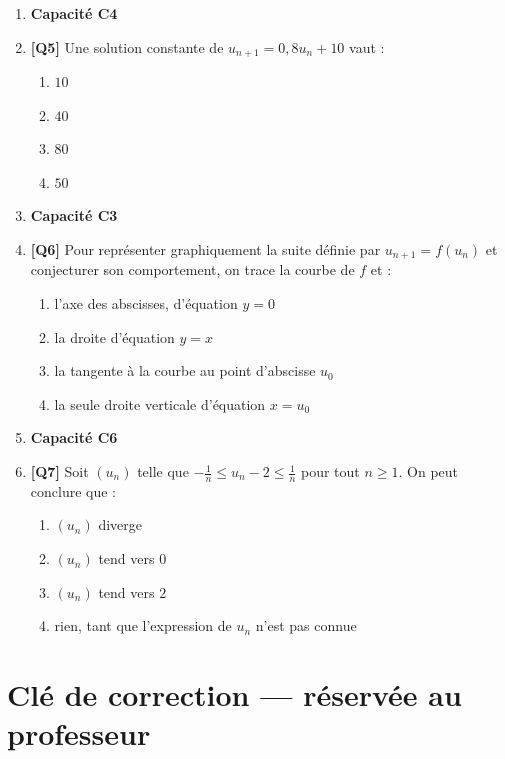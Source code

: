 \begin{enumerate}
\item[] \textbf{Capacité C4}

\item \textbf{[Q5]} Une solution constante de $u_{n+1}=0{,}8u_n+10$ vaut :
  \begin{enumerate}[label=\Alph*.]
    \item $10$
    \item $40$
    \item $80$
    \item $50$
  \end{enumerate}

\item[] \textbf{Capacité C3}

\item \textbf{[Q6]} Pour représenter graphiquement la suite définie par $u_{n+1}=f(u_n)$ et conjecturer son comportement, on trace la courbe de $f$ et :
  \begin{enumerate}[label=\Alph*.]
    \item l'axe des abscisses, d'équation $y=0$
    \item la droite d'équation $y=x$
    \item la tangente à la courbe au point d'abscisse $u_0$
    \item la seule droite verticale d'équation $x=u_0$
  \end{enumerate}

\item[] \textbf{Capacité C6}

\item \textbf{[Q7]} Soit $(u_n)$ telle que $-\tfrac1n\leq u_n-2\leq\tfrac1n$ pour tout $n\geq1$. On peut conclure que :
  \begin{enumerate}[label=\Alph*.]
    \item $(u_n)$ diverge
    \item $(u_n)$ tend vers $0$
    \item $(u_n)$ tend vers $2$
    \item rien, tant que l'expression de $u_n$ n'est pas connue
  \end{enumerate}

\end{enumerate}

\ifnxVersionProfesseur
\clearpage
\section*{Clé de correction — réservée au professeur}

